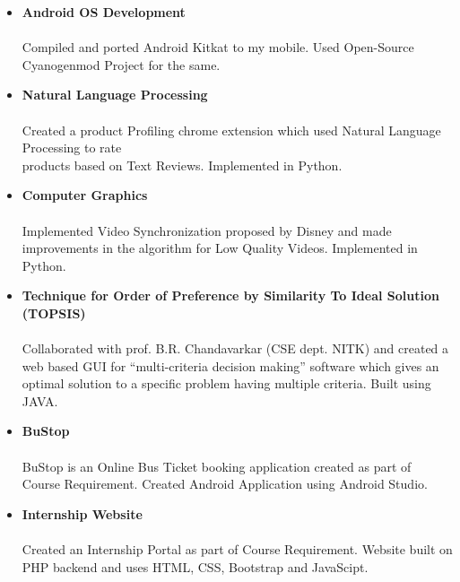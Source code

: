 \documentclass[10pt]{article} %
\begin{document}
\begin{itemize}
\item{\bf Android OS Development} \\
\\
Compiled and ported Android Kitkat to my mobile. Used Open-Source Cyanogenmod Project for the same. \\

\item{\bf Natural Language Processing} \\
\\
Created a product Profiling chrome extension which used Natural Language Processing to rate \\
products based on Text Reviews. Implemented in Python. \\

\item{\bf Computer Graphics} \\
\\
Implemented Video Synchronization proposed by Disney and made improvements in the algorithm for Low Quality Videos. Implemented in Python. \\

\item{\bf Technique for Order of Preference by Similarity To Ideal Solution (TOPSIS)} \\
\\
Collaborated with prof. B.R. Chandavarkar (CSE dept. NITK) and created a web based GUI for “multi-criteria decision making” software which gives an optimal solution to a specific problem having multiple criteria. Built using JAVA. \\

\item{\bf BuStop} \\
\\
BuStop is an Online Bus Ticket booking application created as part of Course Requirement. Created Android Application using Android Studio. \\

\item{\bf Internship Website} \\
\\
Created an Internship Portal as part of Course Requirement. Website built on PHP backend and uses HTML, CSS, Bootstrap  and JavaScipt. \\

\end{itemize}

\end{document}
